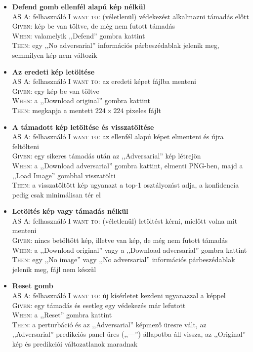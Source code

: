 \begin{itemize}
  \item \textbf{Defend gomb ellenfél alapú kép nélkül}\\ 
    AS A: felhasználó \textsc{I want to}: (véletlenül) védekezést alkalmazni támadás előtt\\ 
    \textsc{Given}: kép be van töltve, de még nem futott támadás\\ 
    \textsc{When}: valamelyik ,,Defend'' gombra kattint\\ 
    \textsc{Then}: egy ,,No adversarial'' információs párbeszédablak jelenik meg, semmilyen kép nem változik 

  \item \textbf{Az eredeti kép letöltése}\\ 
    AS A: felhasználó \textsc{I want to}: az eredeti képet fájlba menteni\\ 
    \textsc{Given}: egy kép be van töltve\\ 
    \textsc{When}: a ,,Download original'' gombra kattint\\ 
    \textsc{Then}: megkapja a mentett $224\times224$ pixeles fájlt 

  \item \textbf{A támadott kép letöltése és visszatöltése}\\ 
    AS A: felhasználó \textsc{I want to}: az ellenfél alapú képet elmenteni és újra feltölteni\\ 
    \textsc{Given}: egy sikeres támadás után az ,,Adversarial'' kép létrejön\\ 
    \textsc{When}: a ,,Download adversarial'' gombra kattint, elmenti PNG-ben, majd a ,,Load Image'' gombbal visszatölti\\ 
    \textsc{Then}: a visszatöltött kép ugyanazt a top-1 osztályozást adja, a konfidencia pedig csak minimálisan tér el 

  \item \textbf{Letöltés kép vagy támadás nélkül}\\ 
    AS A: felhasználó \textsc{I want to}: (véletlenül) letöltést kérni, mielőtt volna mit menteni\\ 
    \textsc{Given}: nincs betöltött kép, illetve van kép, de még nem futott támadás\\ 
    \textsc{When}: a ,,Download original'' vagy a ,,Download adversarial'' gombra kattint\\ 
    \textsc{Then}: egy ,,No image'' vagy ,,No adversarial'' információs párbeszédablak jelenik meg, fájl nem készül 

  \item \textbf{Reset gomb}\\ 
    AS A: felhasználó \textsc{I want to}: új kísérletet kezdeni ugyanazzal a képpel\\ 
    \textsc{Given}: egy támadás és esetleg egy védekezés már lefutott\\ 
    \textsc{When}: a ,,Reset'' gombra kattint\\ 
    \textsc{Then}: a perturbáció és az ,,Adversarial'' képmező üresre vált, az ,,Adversarial'' predikciós panel üres 
    (,,---'') állapotba áll vissza, az ,,Original'' kép és predikciói változatlanok maradnak 


\end{itemize}
